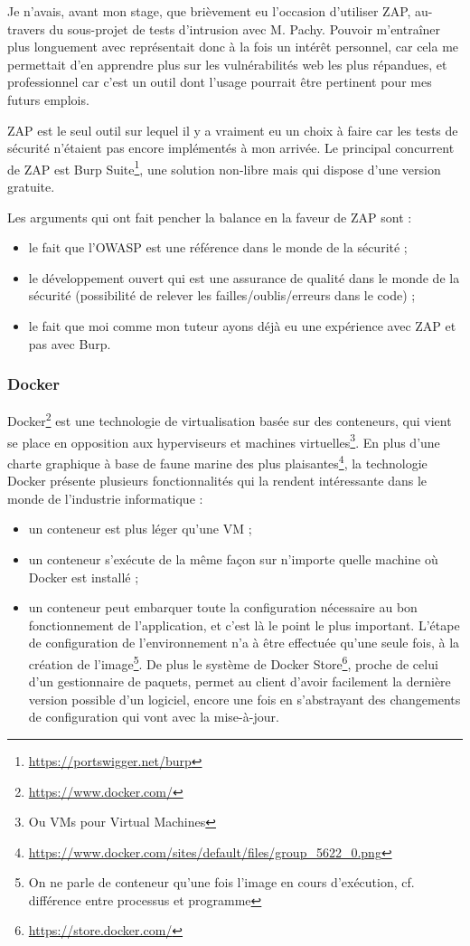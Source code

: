 Je n'avais, avant mon stage, que brièvement eu l'occasion d'utiliser ZAP, au-travers du sous-projet de tests d'intrusion avec M. Pachy. Pouvoir m'entraîner plus longuement avec représentait donc à la fois un intérêt personnel, car cela me permettait d'en apprendre plus sur les vulnérabilités web les plus répandues, et professionnel car c'est un outil dont l'usage pourrait être pertinent pour mes futurs emplois.

ZAP est le seul outil sur lequel il y a vraiment eu un choix à faire car les tests de sécurité n'étaient pas encore implémentés à mon arrivée. Le principal concurrent de ZAP est Burp Suite\footnote{\url{https://portswigger.net/burp}}, une solution non-libre mais qui dispose d'une version gratuite. 

Les arguments qui ont fait pencher la balance en la faveur de ZAP sont :
\begin{itemize}[label=$\bullet$]
  \item le fait que l'OWASP est une référence dans le monde de la sécurité ;
  \item le développement ouvert qui est une assurance de qualité dans le monde de la sécurité (possibilité de relever les failles/oublis/erreurs dans le code) ;
  \item le fait que moi comme mon tuteur ayons déjà eu une expérience avec ZAP et pas avec Burp.
\end{itemize}

\subsubsection{Docker}
Docker\footnote{\url{https://www.docker.com/}} est une technologie de virtualisation basée sur des conteneurs, qui vient se place en opposition aux hyperviseurs et machines virtuelles\footnote{Ou VMs pour Virtual Machines}. En plus d'une charte graphique à base de faune marine des plus plaisantes\footnote{\url{https://www.docker.com/sites/default/files/group_5622_0.png}}, la technologie Docker présente plusieurs fonctionnalités qui la rendent intéressante dans le monde de l'industrie informatique :
\begin{itemize}[label=$\bullet$]
\item un conteneur est plus léger qu'une VM ;
\item un conteneur s'exécute de la même façon sur n'importe quelle machine où Docker est installé ;
\item un conteneur peut embarquer toute la configuration nécessaire au bon fonctionnement de l'application, et c'est là le point le plus important. L'étape de configuration de l'environnement n'a à être effectuée qu'une seule fois, à la création de l'image\footnote{On ne parle de conteneur qu'une fois l'image en cours d'exécution, cf. différence entre processus et programme}. De plus le système de Docker Store\footnote{\url{https://store.docker.com/}}, proche de celui d'un gestionnaire de paquets, permet au client d'avoir facilement la dernière version possible d'un logiciel, encore une fois en s'abstrayant des changements de configuration qui vont avec la mise-à-jour.
\end{itemize}

